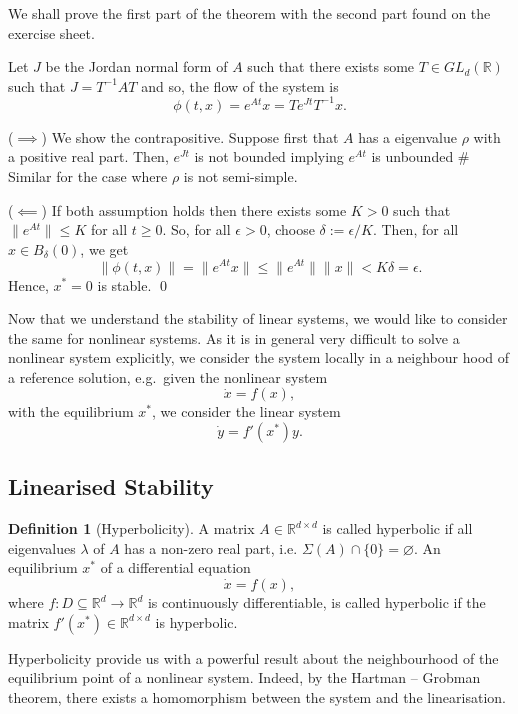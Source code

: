 \documentclass[
]{article}
\theoremstyle{definition}
\theoremstyle{definition}
\newtheorem{definition}{Definition}[section]
\begin{document}
\proof

We shall prove the first part of the theorem with the second part found
on the exercise sheet.

Let \(J\) be the Jordan normal form of \(A\) such that there exists some
\(T \in GL_d(\mathbb{R})\) such that \(J = T^{-1}A T\) and so, the flow
of the system is \[\phi(t, x) = e^{At}x = T e^{Jt} T^{-1}x.\]

(\(\implies\)) We show the contrapositive. Suppose first that \(A\) has
a eigenvalue \(\rho\) with a positive real part. Then, \(e^{Jt}\) is not
bounded implying \(e^{At}\) is unbounded \# Similar for the case where
\(\rho\) is not semi-simple.

(\(\impliedby\)) If both assumption holds then there exists some
\(K > 0\) such that \(\|e^{At}\| \le K\) for all \(t \ge 0\). So, for
all \(\epsilon > 0\), choose \(\delta := \epsilon / K\). Then, for all
\(x \in B_\delta(0)\), we get
\[\|\phi(t, x)\| = \|e^{At}x\| \le \|e^{At}\| \|x\| < K \delta = \epsilon.\]
Hence, \(x^* = 0\) is stable. \qed

Now that we understand the stability of linear systems, we would like to
consider the same for nonlinear systems. As it is in general very
difficult to solve a nonlinear system explicitly, we consider the system
locally in a neighbour hood of a reference solution, e.g.~given the
nonlinear system \[\dot x = f(x),\] with the equilibrium \(x^*\), we
consider the linear system \[\dot y = f'(x^*) y.\]

\hypertarget{linearised-stability}{%
\subsection{Linearised Stability}\label{linearised-stability}}

\begin{definition}[Hyperbolicity]
  A matrix \(A \in \mathbb{R}^{d \times d}\) is called hyperbolic if all eigenvalues 
  \(\lambda\) of \(A\) has a non-zero real part, i.e. \(\Sigma(A) \cap \{0\} = \varnothing\). 
  An equilibrium \(x^*\) of a differential equation 
  \[\dot x = f(x),\]
  where \(f : D \subseteq \mathbb{R}^d \to \mathbb{R}^d\) is continuously differentiable, 
  is called hyperbolic if the matrix \(f'(x^*) \in \mathbb{R}^{d \times d}\) is 
  hyperbolic.
\end{definition}

Hyperbolicity provide us with a powerful result about the neighbourhood
of the equilibrium point of a nonlinear system. Indeed, by the Hartman
-- Grobman theorem, there exists a homomorphism between the system and
the linearisation.
\end{document}
